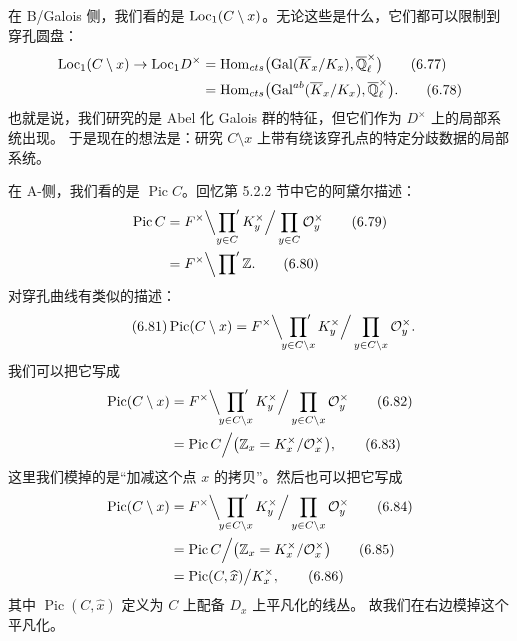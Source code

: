 在 B/Galois 侧，我们看的是 $\mathrm{Loc}_1(C\setminus x)$。无论这些是什么，它们都可以限制到穿孔圆盘：
\begin{align}
\mathrm{Loc}_1(C\setminus x)\to\mathrm{Loc}_1 D^{\times}
&=\mathrm{Hom}_{cts}\bigl(\mathrm{Gal}(\overline{K}_x/K_x),\overline{\mathbb{Q}}_{\ell}^{\times}\bigr)\tag{6.77}\label{eq:6.77}\\
&=\mathrm{Hom}_{cts}\bigl(\mathrm{Gal}^{ab}(\overline{K}_x/K_x),\overline{\mathbb{Q}}_{\ell}^{\times}\bigr).\tag{6.78}\label{eq:6.78}
\end{align}
也就是说，我们研究的是 Abel 化 Galois 群的特征，但它们作为 $D^{\times}$ 上的局部系统出现。
于是现在的想法是：研究 $C\setminus x$ 上带有绕该穿孔点的特定分歧数据的局部系统。

在 A-侧，我们看的是 $\operatorname{Pic}C$。回忆第 5.2.2 节中它的阿黛尔描述：
\begin{align}
\operatorname{Pic}C
&=F^{\times}\Big\backslash\sideset{}{'}\prod_{y\in C}K_y^{\times}
\Big/\prod_{y\in C}\mathcal{O}_y^{\times}\tag{6.79}\label{eq:6.79}\\
&=F^{\times}\Big\backslash\sideset{}{'}\prod\mathbb{Z} .\tag{6.80}\label{eq:6.80}
\end{align}
对穿孔曲线有类似的描述：
\begin{equation}\tag{6.81}\label{eq:6.81}
\operatorname{Pic}(C\setminus x)
=F^{\times}\Big\backslash\sideset{}{'}\prod_{y\in C\setminus x}K_y^{\times}
\Big/\prod_{y\in C\setminus x}\mathcal{O}_y^{\times}.
\end{equation}
我们可以把它写成
\begin{align}
\operatorname{Pic}(C\setminus x)
&=F^{\times}\Big\backslash\sideset{}{'}\prod_{y\in C\setminus x}K_y^{\times}
\Big/\prod_{y\in C\setminus x}\mathcal{O}_y^{\times}\tag{6.82}\label{eq:6.82}\\
&=\operatorname{Pic}C\Big/\bigl(\mathbb{Z}_x=K_x^{\times}/\mathcal{O}_x^{\times}\bigr),\tag{6.83}\label{eq:6.83}
\end{align}
这里我们模掉的是“加减这个点 $x$ 的拷贝”。然后也可以把它写成
\begin{align}
\operatorname{Pic}(C\setminus x)
&=F^{\times}\Big\backslash\sideset{}{'}\prod_{y\in C\setminus x}K_y^{\times}
\Big/\prod_{y\in C\setminus x}\mathcal{O}_y^{\times}\tag{6.84}\label{eq:6.84}\\
&=\operatorname{Pic}C\Big/\bigl(\mathbb{Z}_x=K_x^{\times}/\mathcal{O}_x^{\times}\bigr)\tag{6.85}\label{eq:6.85}\\
&=\operatorname{Pic}(C,\widehat{x})\big/K_x^{\times},\tag{6.86}\label{eq:6.86}
\end{align}
其中 $\operatorname{Pic}(C,\widehat{x})$ 定义为 $C$ 上配备 $D_x$ 上平凡化的线丛。
故我们在右边模掉这个平凡化。

